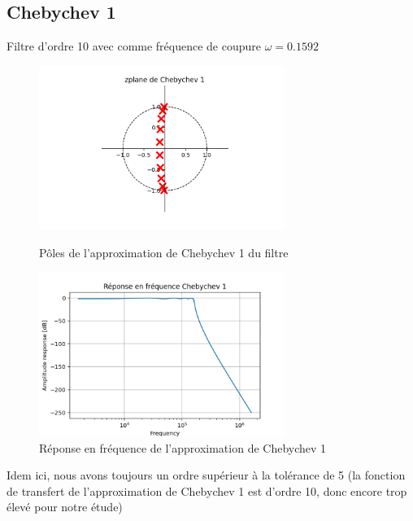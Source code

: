 \documentclass[a4paper,12pt,oneside]{report}	%
\begin{document}
        \subsection{Chebychev 1}
            Filtre d'ordre 10 avec comme fréquence de coupure $\omega = 0.1592$
            \begin{figure}[h!]
                \centering
                \includegraphics[width = 8cm]{code-projet-python/2.0.0 - zplane de Chebychev 1.png}
                \caption{Pôles de l'approximation de Chebychev 1 du filtre}
                \label{fig:zplane-Chebychev1}
                \includegraphics[width = 8cm]{code-projet-python/2.0.0 - Réponse en fréquence Chebychev 1.png}
                \caption{Réponse en fréquence de l'approximation de Chebychev 1}
                \label{fig:repfreq-Chebychev1}
            \end{figure}
            
            Idem ici, nous avons toujours un ordre supérieur à la tolérance de 5 (la fonction de transfert de l'approximation de Chebychev 1 est d'ordre 10, donc encore trop élevé pour notre étude)
\newpage
\end{document}
